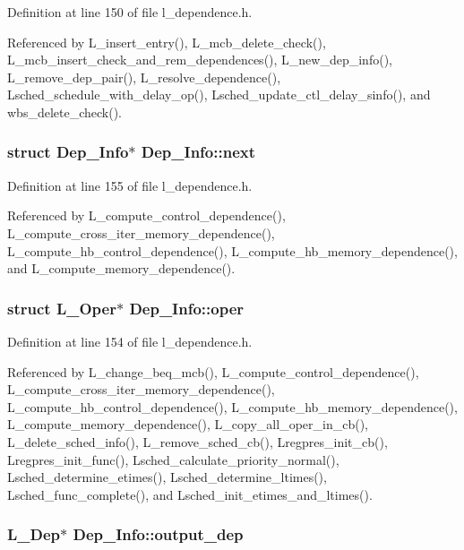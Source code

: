 Definition at line 150 of file l\_\-dependence.h.

Referenced by L\_\-insert\_\-entry(), L\_\-mcb\_\-delete\_\-check(), L\_\-mcb\_\-insert\_\-check\_\-and\_\-rem\_\-dependences(), L\_\-new\_\-dep\_\-info(), L\_\-remove\_\-dep\_\-pair(), L\_\-resolve\_\-dependence(), Lsched\_\-schedule\_\-with\_\-delay\_\-op(), Lsched\_\-update\_\-ctl\_\-delay\_\-sinfo(), and wbs\_\-delete\_\-check().
\subsubsection{\setlength{\rightskip}{0pt plus 5cm}struct \bf{Dep\_\-Info}$\ast$ \bf{Dep\_\-Info::next}}\label{structDep__Info_91234d01ebe7e748c8a967c08a6c9126}




Definition at line 155 of file l\_\-dependence.h.

Referenced by L\_\-compute\_\-control\_\-dependence(), L\_\-compute\_\-cross\_\-iter\_\-memory\_\-dependence(), L\_\-compute\_\-hb\_\-control\_\-dependence(), L\_\-compute\_\-hb\_\-memory\_\-dependence(), and L\_\-compute\_\-memory\_\-dependence().
\subsubsection{\setlength{\rightskip}{0pt plus 5cm}struct L\_\-Oper$\ast$ \bf{Dep\_\-Info::oper}}\label{structDep__Info_977274aa7e08d6decb0251bc4d3b1f49}




Definition at line 154 of file l\_\-dependence.h.

Referenced by L\_\-change\_\-beq\_\-mcb(), L\_\-compute\_\-control\_\-dependence(), L\_\-compute\_\-cross\_\-iter\_\-memory\_\-dependence(), L\_\-compute\_\-hb\_\-control\_\-dependence(), L\_\-compute\_\-hb\_\-memory\_\-dependence(), L\_\-compute\_\-memory\_\-dependence(), L\_\-copy\_\-all\_\-oper\_\-in\_\-cb(), L\_\-delete\_\-sched\_\-info(), L\_\-remove\_\-sched\_\-cb(), Lregpres\_\-init\_\-cb(), Lregpres\_\-init\_\-func(), Lsched\_\-calculate\_\-priority\_\-normal(), Lsched\_\-determine\_\-etimes(), Lsched\_\-determine\_\-ltimes(), Lsched\_\-func\_\-complete(), and Lsched\_\-init\_\-etimes\_\-and\_\-ltimes().
\subsubsection{\setlength{\rightskip}{0pt plus 5cm}\bf{L\_\-Dep}$\ast$ \bf{Dep\_\-Info::output\_\-dep}}\label{structDep__Info_1649b5225c3af1cfec36ad1283e8d5b2}





